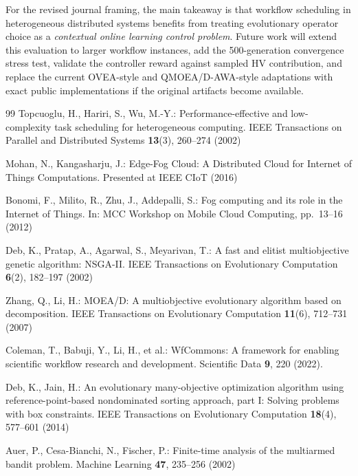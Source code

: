 \documentclass[runningheads]{llncs}
\begin{document}
For the revised journal framing, the main takeaway is that workflow scheduling in heterogeneous distributed systems benefits from treating evolutionary operator choice as a \emph{contextual online learning control problem}. Future work will extend this evaluation to larger workflow instances, add the 500-generation convergence stress test, validate the controller reward against sampled HV contribution, and replace the current OVEA-style and QMOEA/D-AWA-style adaptations with exact public implementations if the original artifacts become available.
\enlargethispage{3\baselineskip}
\begin{thebibliography}{99}
\footnotesize
\setlength{\itemsep}{0pt}
\setlength{\parskip}{0pt}
\setlength{\parsep}{0pt}
Topcuoglu, H., Hariri, S., Wu, M.-Y.: Performance-effective and low-complexity task scheduling for heterogeneous computing. IEEE Transactions on Parallel and Distributed Systems \textbf{13}(3), 260--274 (2002)

Mohan, N., Kangasharju, J.: Edge-Fog Cloud: A Distributed Cloud for Internet of Things Computations. Presented at IEEE CIoT (2016)

Bonomi, F., Milito, R., Zhu, J., Addepalli, S.: Fog computing and its role in the Internet of Things. In: MCC Workshop on Mobile Cloud Computing, pp.~13--16 (2012)

Deb, K., Pratap, A., Agarwal, S., Meyarivan, T.: A fast and elitist multiobjective genetic algorithm: NSGA-II. IEEE Transactions on Evolutionary Computation \textbf{6}(2), 182--197 (2002)

Zhang, Q., Li, H.: MOEA/D: A multiobjective evolutionary algorithm based on decomposition. IEEE Transactions on Evolutionary Computation \textbf{11}(6), 712--731 (2007)

Coleman, T., Babuji, Y., Li, H., et al.: WfCommons: A framework for enabling scientific workflow research and development. Scientific Data \textbf{9}, 220 (2022).

Deb, K., Jain, H.: An evolutionary many-objective optimization algorithm using reference-point-based nondominated sorting approach, part I: Solving problems with box constraints. IEEE Transactions on Evolutionary Computation \textbf{18}(4), 577--601 (2014)

Auer, P., Cesa-Bianchi, N., Fischer, P.: Finite-time analysis of the multiarmed bandit problem. Machine Learning \textbf{47}, 235--256 (2002)


\end{thebibliography}
\end{document}
